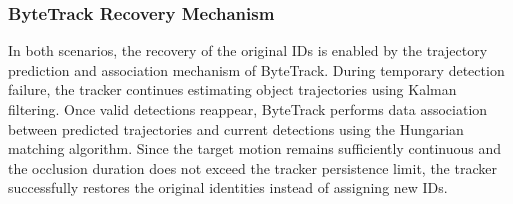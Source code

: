 \subsubsection{ByteTrack Recovery Mechanism}
In both scenarios, the recovery of the original IDs is enabled by the trajectory prediction and association mechanism of ByteTrack. During temporary detection failure, the tracker continues estimating object trajectories using Kalman filtering. Once valid detections reappear, ByteTrack performs data association between predicted trajectories and current detections using the Hungarian matching algorithm. Since the target motion remains sufficiently continuous and the occlusion duration does not exceed the tracker persistence limit, the tracker successfully restores the original identities instead of assigning new IDs.
